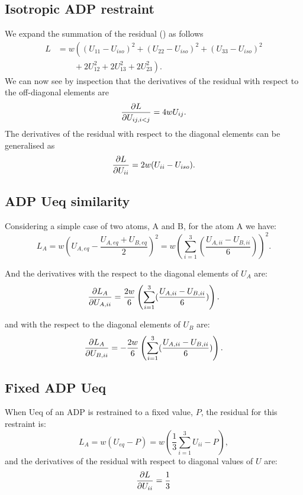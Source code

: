 \documentclass[pdf]{iucr}
\begin{document}
\subsection{Isotropic ADP restraint}

We expand the summation of the residual () as follows
\begin{align}
L &= w \left( (U_{11} - U_{iso})^2 + (U_{22} - U_{iso})^2 + (U_{33} - U_{iso})^2 \right.\nonumber \\
&\left. \qquad + 2 U_{12}^2 + 2 U_{13}^2 + 2 U_{23}^2 \right) .
\end{align}
We can now see by inspection that the derivatives of the residual with respect to the off-diagonal elements are
\begin{equation}
\frac{\partial L}{\partial U_{ij,i<j}} = 4 w U_{ij}.
\end{equation}
The derivatives of the residual with respect to the diagonal elements can be generalised as
\begin{equation}
\frac{\partial L}{\partial U_{ii}} = 2 w (U_{ii} - U_{iso}) .
\end{equation}

\subsection{ADP Ueq similarity}
Considering a simple case of two atoms, A and B, for the atom A we have:
\begin{equation}
L_{A} = w  \left(U_{A,eq}-\frac{U_{A,eq}+U_{B,eq}}{2}\right)^2 = w \left( \sum_{i=1}^3 (\frac{U_{A,ii} - U_{B,ii}}{6}) \right) ^2.
\end{equation}

And the derivatives with the respect to the diagonal elements of $U_{A}$ are:
\begin{equation}
\frac{\partial L_{A}}{\partial U_{A,ii}} = \frac{2w}{6} \left(\sum_{i=1}^3(\frac{U_{A,ii} - U_{B,ii}}{6})\right) .
\end{equation}

and with the respect to the diagonal elements of $U_{B}$ are:
\begin{equation}
\frac{\partial L_{A}}{\partial U_{B,ii}} = -\frac{2w}{6} \left(\sum_{i=1}^3(\frac{U_{A,ii} - U_{B,ii}}{6})\right) .
\end{equation}

\subsection{Fixed ADP Ueq}
When Ueq of an ADP is restrained to a fixed value, $P$, the residual for this restraint is:
\begin{equation}
L_{A} = w  (U_{eq}-P) = w \left(\frac{1}{3}\sum_{i=1}^3U_{ii}-P \right),
\end{equation}
and the derivatives of the residual with respect to diagonal values of $U$ are:
\begin{equation}
\frac{\partial L}{\partial U_{ii}} = \frac{1}{3}
\end{equation}
\end{document}
